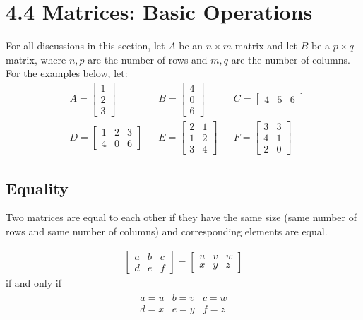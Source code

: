 \documentclass[14pt]{extarticle}
\begin{document}
\section*{4.4 Matrices: Basic Operations}
For all discussions in this section, let $A$ be an $n\times m$ matrix and let $B$ be a $p\times q$ matrix, where $n, p$ are the number of rows and $m, q$ are the number of columns. For the examples below, let:
\begin{align*}
	&A = \begin{bmatrix}
		1 \\
		2 \\
		3
	\end{bmatrix} &
	&B = \begin{bmatrix}
		4 \\
		0 \\
		6
	\end{bmatrix} &
	&C =\begin{bmatrix}
		4 & 5 & 6
	\end{bmatrix} \\
	&D = \begin{bmatrix}
		1 & 2 & 3 \\
		4 & 0 & 6
	\end{bmatrix} &
	&E = \begin{bmatrix}
		2 & 1 \\
		1 & 2 \\
		3 & 4
	\end{bmatrix} &
	&F = \begin{bmatrix}
		3 & 3 \\
		4 & 1 \\
		2 & 0
	\end{bmatrix}
\end{align*}

\subsection{Equality}
Two matrices are equal to each other if they have the same size (same number of rows and same number of columns) and corresponding elements are equal.

\begin{align*}
	\begin{bmatrix}
		a & b & c \\
		d & e & f
	\end{bmatrix}
	=
	\begin{bmatrix}
		u & v & w \\
		x & y & z
	\end{bmatrix}
\end{align*}
if and only if
\begin{align*}
	\begin{array}{ccc}
		a=u & b=v & c=w \\
		d=x & e=y & f=z
	\end{array}
\end{align*}
\end{document}
